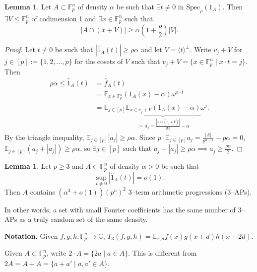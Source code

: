 \documentclass{article}
\theoremstyle{definition}
\newtheorem{lemma}[theorem]{Lemma}
\begin{document}
\begin{lemma}\label{lemma1.15}
    Let $A \subset \mathbb{F}_p^n$ of density $\alpha$ be such that $\exists t \neq 0$ in $\text{Spec}_{\rho}(1_A)$. Then $\exists V \le \mathbb{F}_p^n$ of codimension 1 and $\exists x \in \mathbb{F}_p^n$ such that \[
    |A \cap (x+V)| \ge \alpha \left(1+\frac{\rho}{2}\right)|V|.
    \]
\end{lemma}
\begin{proof}
    Let $t\neq 0$ be such that $|\hat{1}_A(t)|\ge \rho \alpha$ and let $V = \langle t \rangle^{\perp}$. Write $v_j + V$ for $j \in [p] := \{1,2,\ldots,p\}$ for the cosets of $V$ such that $v_j + V = \{x \in \mathbb{F}_p^n \mid x \cdot t = j\}$. Then 
    \begin{align*}
        \rho \alpha \le \hat{1}_A(t) &= \hat{f}_A(t) \\
        &= \mathbb{E}_{x \in \mathbb{F}_p^n}(1_A(x)-\alpha)\omega^{x \cdot t} \\
        &= \mathbb{E}_{j \in [p]}\underbrace{\mathbb{E}_{x \in v_j+V}(1_A(x)-\alpha)}_{:= a_j = \frac{|A \cap (v_j +V)|}{|V|}-\alpha}\omega^j.
    \end{align*}
    By the triangle inequality, $\mathbb{E}_{j \in [p]} |a_j|\ge \rho \alpha$. Since $p\cdot \mathbb{E}_{j \in [p]}a_j = \frac{|A|}{p^{n-1}}- p \alpha = 0$, $\mathbb{E}_{j \in [p]}(a_j + |a_j|) \ge \rho \alpha$, so $\exists j \in [p]$ such that $a_j + |a_j| \ge \rho \alpha \implies a_j \ge \frac{\rho \alpha}{2}$.
\end{proof}


\begin{lemma}\label{lemma1.16}
    Let $p\ge 3$ and $A \subset \mathbb{F}_p^n$ of density $\alpha > 0$ be such that $$\sup_{t \neq 0} |\hat{1}_A(t)| = o(1).$$ Then $A$ contains $(\alpha^3+o(1))(p^n)^2$ 3--term arithmetic progressions (3--APs).
\end{lemma}
In other words, a set with small Fourier coefficients has the same number of 3--APs as a truly random set of the same density.
\vspace{1mm}
 
\textbf{Notation.} Given $f,g,h : \mathbb{F}_p^n \to \mathbb{C}$, $T_3(f,g,h) = \mathbb{E}_{x,d} f(x)g(x+d)h(x+2d)$. 

\vspace{1mm}
 
Given $A \subset \mathbb{F}_p^n$, write $2 \cdot A = \{2a \mid a \in A\}$. This is different from $2A = A + A =\{a + a' \mid a,a' \in A\}$.
\end{document}
